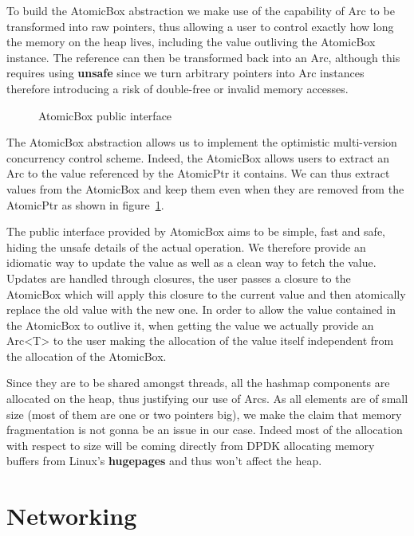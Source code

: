 \documentclass[11pt]{book}
\begin{document}
To build the AtomicBox abstraction we make use of the capability of
Arc to be transformed into raw pointers, thus allowing a user to
control exactly how long the memory on the heap lives, including the
value outliving the AtomicBox instance. The reference can then be
transformed back into an Arc, although this requires using
\textbf{unsafe} since we turn arbitrary pointers into Arc instances
therefore introducing a risk of double-free or invalid memory
accesses.

\begin{figure}[htb!]
  \label{code:atomicbox-interface}
  
  \caption{AtomicBox public interface}
\end{figure}

The AtomicBox abstraction allows us to implement the optimistic
multi-version concurrency control scheme. Indeed, the AtomicBox allows
users to extract an Arc to the value referenced by the AtomicPtr it
contains. We can thus extract values from the AtomicBox and keep them
even when they are removed from the AtomicPtr as shown in
figure~\ref{code:atomicbox-interface}.

The public interface provided by AtomicBox aims to be simple, fast and
safe, hiding the unsafe details of the actual operation. We therefore
provide an idiomatic way to update the value as well as a clean way to
fetch the value. Updates are handled through closures, the user passes
a closure to the AtomicBox which will apply this closure to the
current value and then atomically replace the old value with the new
one. In order to allow the value contained in the AtomicBox to outlive
it, when getting the value we actually provide an Arc<T> to the user
making the allocation of the value itself independent from the
allocation of the AtomicBox.

Since they are to be shared amongst threads, all the hashmap
components are allocated on the heap, thus justifying our use of
Arcs. As all elements are of small size (most of them are one or two
pointers big), we make the claim that memory fragmentation is not
gonna be an issue in our case. Indeed most of the allocation with
respect to size will be coming directly from DPDK allocating memory
buffers from Linux's \textbf{hugepages} and thus won't affect the
heap.

\section{Networking}
\end{document}
